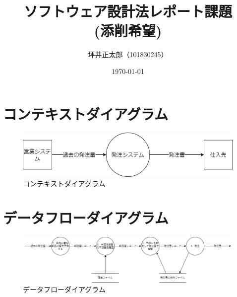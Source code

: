 \documentclass[a4paper,10pt]{jsarticle}
\begin{document}
\title{ソフトウェア設計法レポート課題\\(添削希望)}
\author{坪井正太郎（101830245）}
\date{\today}
\maketitle
\section{コンテキストダイアグラム}
\begin{figure}[H]
  \centering
  \includegraphics[width=\linewidth]{01.drawio.png}
  \caption{コンテキストダイアグラム}
  \label{コンテキストダイアグラム}
\end{figure}

\section{データフローダイアグラム}
\begin{figure}[H]
  \centering
  \includegraphics[width=\linewidth]{02.drawio.png}
  \caption{データフローダイアグラム}
  \label{データフローダイアグラム}
\end{figure}
\end{document}
